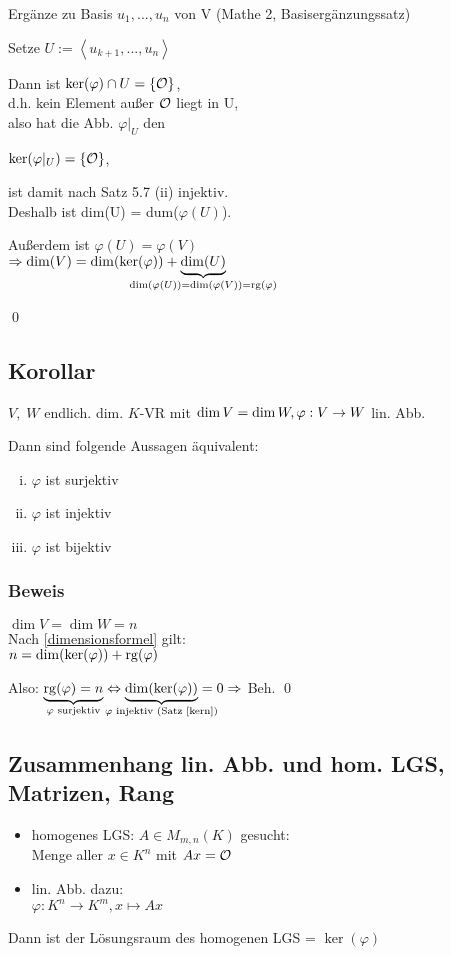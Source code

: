 Ergänze zu Basis $u_1,...,u_n$ von V (Mathe 2, Basisergänzungssatz)

Setze $U:= \left< u_{k+1},..., u_n \right>$

Dann ist $\ker(\varphi) \cap U = \{ \mathcal{O} \}$, \\d.h. kein Element außer $\mathcal{O}$ liegt in U, \\also hat die Abb. $\varphi|_U$ den 

$\ker(\varphi|_U) = \{ \mathcal{O} \}$, 

ist damit nach Satz 5.7 (ii) injektiv. \\
Deshalb ist dim(U) = dum($\varphi(U)$). 

Außerdem ist $\varphi(U) = \varphi(V)$\\
$\Rightarrow \dim(V) = \dim(\ker(\varphi)) + \underbrace{\dim(U)}_{\mathclap{\dim(\varphi(U)) = \dim(\varphi(V)) = \rg(\varphi)}}$

\qed
\subsection{Korollar}
$V,\; W$ endlich. dim. $K$-VR mit $\dim V = \dim W, \; \\\varphi: V \rightarrow W$ lin. Abb. 

Dann sind folgende Aussagen äquivalent:
\begin{enumerate}[(i)]
	\item $\varphi$ ist surjektiv
	\item $\varphi$ ist injektiv
	\item $\varphi$ ist bijektiv
\end{enumerate}

\subsubsection*{Beweis}
$\dim V = \dim W = n$\\

Nach \ref{dimensionsformel} gilt:\\
$n = \dim(\ker(\varphi)) + \mathrm{ rg }(\varphi)$

Also: $\underbrace{\rg(\varphi)=n}_{\mathclap{\varphi \text{ surjektiv}}} \Leftrightarrow \underbrace{\dim(\ker(\varphi))}_{\mathclap{\varphi \text{ injektiv (Satz~\ref{kern}})}} = 0\\
\Rightarrow$ Beh.
\qed

\subsection{Zusammenhang lin. Abb. und hom. LGS, Matrizen, Rang}
\begin{itemize}
	\item homogenes LGS: $A \in M_{m,n}(K)$ gesucht: \\
	Menge aller $x \in K^n$ mit $Ax = \mathcal{O}$
	\item lin. Abb. dazu:\\
	 $\varphi: K^n \rightarrow K^m, x \mapsto Ax$
\end{itemize}
Dann ist der Lösungsraum des homogenen LGS = $\ker(\varphi)$